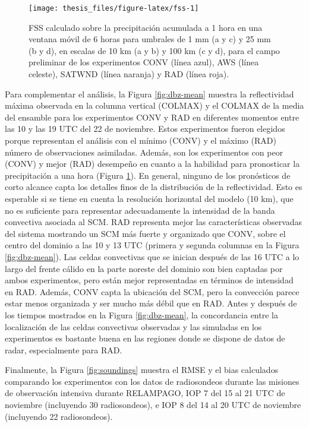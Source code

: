 \documentclass[12pt,oneside]{reedthesis}
\begin{document}
\begin{figure}
\texttt{[image: thesis\_files/figure-latex/fss-1]} \caption{FSS calculado sobre la precipitación acumulada a 1 hora en una ventana móvil de 6 horas para umbrales de 1 mm (a y c) y 25 mm (b y d), en escalas de 10 km (a y b) y 100 km (c y d), para el campo preliminar de los experimentos CONV (línea azul), AWS (línea celeste), SATWND (línea naranja) y RAD (línea roja).}\label{fig:fss}
\end{figure}
Para complementar el análisis, la Figura \ref{fig:dbz-mean} muestra la reflectividad máxima observada en la columna vertical (COLMAX) y el COLMAX de la media del ensamble para los experimentos CONV y RAD en diferentes momentos entre las 10 y las 19 UTC del 22 de noviembre. Estos experimentos fueron elegidos porque representan el análisis con el mínimo (CONV) y el máximo (RAD) número de observaciones asimiladas. Además, son los experimentos con peor (CONV) y mejor (RAD) desempeño en cuanto a la habilidad para pronosticar la precipitación a una hora (Figura \ref{fig:fss}). En general, ninguno de los pronósticos de corto alcance capta los detalles finos de la distribución de la reflectividad. Esto es esperable si se tiene en cuenta la resolución horizontal del modelo (10 km), que no es suficiente para representar adecuadamente la intensidad de la banda convectiva asociada al SCM. RAD representa mejor las características observadas del sistema mostrando un SCM más fuerte y organizado que CONV, sobre el centro del dominio a las 10 y 13 UTC (primera y segunda columnas en la Figura \ref{fig:dbz-mean}). Las celdas convectivas que se inician después de las 16 UTC a lo largo del frente cálido en la parte noreste del dominio son bien captadas por ambos experimentos, pero están mejor representadas en términos de intensidad en RAD. Además, CONV capta la ubicación del SCM, pero la convección parece estar menos organizada y ser mucho más débil que en RAD. Antes y después de los tiempos mostrados en la Figura \ref{fig:dbz-mean}, la concordancia entre la localización de las celdas convectivas observadas y las simuladas en los experimentos es bastante buena en las regiones donde se dispone de datos de radar, especialmente para RAD.

Finalmente, la Figura \ref{fig:soundings} muestra el RMSE y el bias calculados comparando los experimentos con los datos de radiosondeos durante las misiones de observación intensiva durante RELAMPAGO, IOP 7 del 15 al 21 UTC de noviembre (incluyendo 30 radiosondeos), e IOP 8 del 14 al 20 UTC de noviembre (incluyendo 22 radiosondeos).
\end{document}
